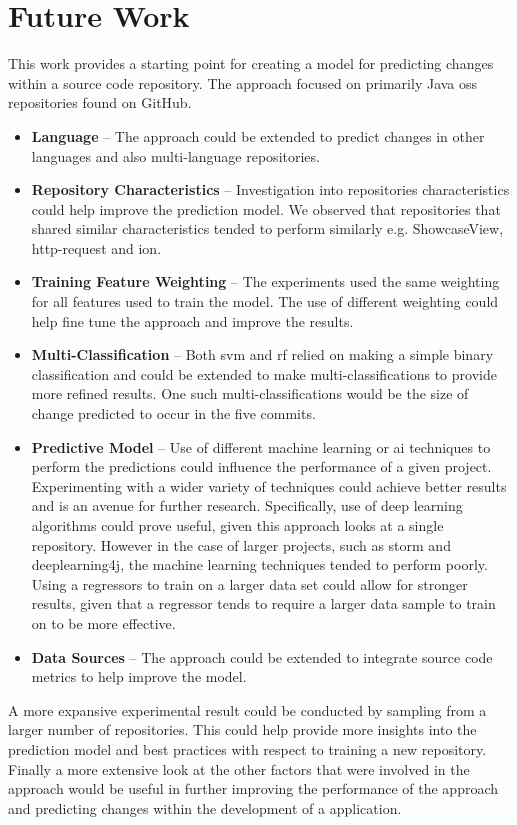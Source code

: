 \section{Future Work}

This work provides a starting point for creating a model for predicting changes within a source code repository. The approach focused on primarily Java \gls{oss} repositories found on GitHub.

\begin{itemize}
\item \textbf{Language} -- The approach could be extended to predict changes in other languages and also multi-language repositories.
\item \textbf{Repository Characteristics} -- Investigation into repositories characteristics could help improve the prediction model. We observed that repositories that shared similar characteristics tended to perform similarly e.g. ShowcaseView, http-request and ion.
\item \textbf{Training Feature Weighting} -- The experiments used the same weighting for all features used to train the model. The use of different weighting could help fine tune the approach and improve the results.
\item \textbf{Multi-Classification} -- Both \gls{svm} and \gls{rf} relied on making a simple binary classification and could be extended to make multi-classifications to provide more refined results. One such multi-classifications would be the size of change predicted to occur in the five commits.
\item \textbf{Predictive Model} -- Use of different machine learning or \gls{ai} techniques to perform the predictions could influence the performance of a given project. Experimenting with a wider variety of techniques could achieve better results and is an avenue for further research. Specifically, use of deep learning algorithms could prove useful, given this approach looks at a single repository. However in the case of larger projects, such as storm and deeplearning4j, the machine learning techniques tended to perform poorly. Using a regressors to train on a larger data set could allow for stronger results, given that a regressor tends to require a larger data sample to train on to be more effective.
\item \textbf{Data Sources} -- The approach could be extended to integrate source code metrics to help improve the model. 
\end{itemize}

A more expansive experimental result could be conducted by sampling from a larger number of repositories. This could help provide more insights into the prediction model and best practices with respect to training a new repository. Finally a more extensive look at the other factors that were involved in the approach would be useful in further improving the performance of the approach and predicting changes within the development of a application.





